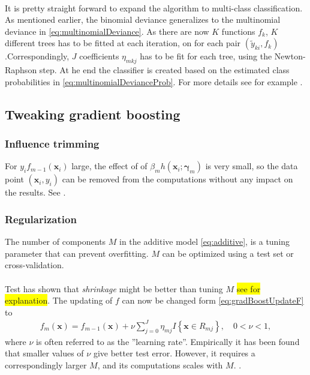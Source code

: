 \\
It is pretty straight forward to expand the algorithm to multi-class classification. As mentioned earlier, the binomial deviance generalizes to the multinomial deviance in \eqref{eq:multinomialDeviance}. As there are now $K$ functions $f_k$, $K$ different trees has to be fitted at each iteration, on for each pair $(\tilde y_{k i}, f_k)$.Correspondingly, $J$ coefficients $\eta_{m k j}$ has to be fit for each tree, using the Newton-Raphson step. At he end the classifier is created based on the estimated class probabilities in \eqref{eq:multinomialDevianceProb}. For more details see for example \cite{friedman}.

\subsection{Tweaking gradient boosting}
\label{sub:Tweaking gradient boosting}

\subsubsection{Influence trimming}
\label{sub:Influence trimming}
For $y_i f_{m-1}(\mathbf{x}_i)$ large, the effect of of $\beta_m h(\mathbf{x}_i; \bm{\gamma}_m)$ is very small, so the data point $(\mathbf{x}_i, y_i)$ can be removed from the computations without any impact on the results. See \cite{friedman}.

\subsubsection{Regularization}
\label{sub:Regularizatoin}
The number of components $M$ in the additive model \eqref{eq:additive}, is a tuning parameter that can prevent overfitting. $M$ can be optimized using a test set or cross-validation.\\
\\
Test has shown that \textit{shrinkage} might be better than tuning $M$ \cite{copas1983} \colorbox{yellow}{see \cite{friedman} for explanation}. The updating of $f$ can now be changed form \eqref{eq:gradBoostUpdateF} to 
\begin{align}
  f_m(\mathbf{x}) = f_{m-1}(\mathbf{x}) +  \nu \sum^{J}_{j=0} \eta_{m j} I\left\{ \mathbf{x} \in R_{m j} \right\}, \quad 0 < \nu < 1,
\end{align}
where $\nu$ is often referred to as the ''learning rate''. Empirically it has been found \cite{friedman} that smaller values of $\nu$ give better test error. However, it requires a correspondingly larger $M$, and its computations scales with $M$. \cite{breiman}.

